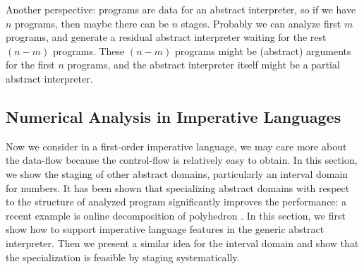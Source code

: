 \iffalse
\paragraph{Partially-Static Context} Under a polyvariant analysis (like
$k$-CFA), such summary generated by specializing static analyzer even could do
more for calling context by partially-static data optimization. For example,
consider that we have a library consists of three functions @f@, @g@ and @h@,
where @f@ calls @g@ and @h@ internally and returns @y@ finally (we extend the
language to have multiple arguments). @g@ and @h@ do not depend on @f@. Now we
would like to modularly specialize these functions, starting from @f@ with an
initial environment containing @f@, @g@ and @h@.
\begin{lstlisting}
  def f(a, b, c) = val x = g(a, b); val y = h(x, c);  y
\end{lstlisting}

Since $k$ is bounded to a fixed number, after the analysis running $k$ steps
inside @f@, the calling context will purely depend on the static structure of
our module being analyzed.
\fi


\iffalse
Another perspective: programs are data for an abstract interpreter, so if we
have $n$ programs, then maybe there can be $n$ stages. Probably we can analyze
first $m$ programs, and generate a residual abstract interpreter waiting for the
rest $(n-m)$ programs. These $(n-m)$ programs might be (abstract) arguments for
the first $n$ programs, and the abstract interpreter itself might be a partial
abstract interpreter.

\subsection{Numerical Analysis in Imperative Languages} \label{cases_imp}

Now we consider in a first-order imperative language, we may care more about the
data-flow because the control-flow is relatively easy to obtain. In this
section, we show the staging of other abstract domains, particularly an interval
domain for numbers. It has been shown that specializing abstract domains with
respect to the structure of analyzed program significantly improves the
performance: a recent example is online decomposition of polyhedron
\cite{DBLP:conf/popl/SinghPV17, Singh:2017:PCD:3177123.3158143}. In this
section, we first show how to support imperative language features in the
generic abstract interpreter. Then we present a similar idea for the interval
domain and show that the specialization is feasible by staging systematically.

